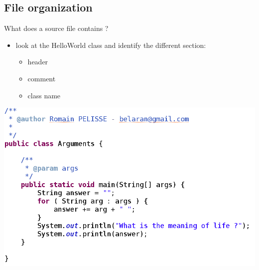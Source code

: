{  \subsection{File organization}
  \begin{frame}
    \begin{block}{What does a source file contains ?}
      \begin{itemize}
        \item look at the HelloWorld class and identify the different section:
        \begin{itemize}
          \item header
          \item comment
          \item class name
        \end{itemize}
      \end{itemize}
    \end{block}
    \begin{center}
      \includegraphics[scale=0.2]{img/java-source-file.png}
    \end{center}
  \end{frame}
}
